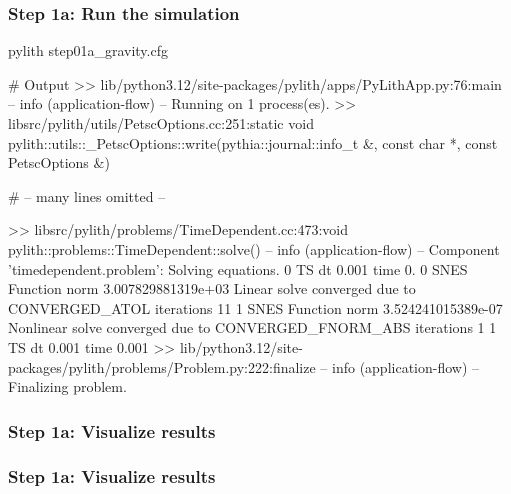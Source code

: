 \documentclass[aspectratio=169]{beamer}
\begin{document}
\begin{frame}[fragile]
  \frametitle{Step 1a: Run the simulation}
  \summary{}

\begin{pyrejournal}
pylith step01a_gravity.cfg

# Output
 >> lib/python3.12/site-packages/pylith/apps/PyLithApp.py:76:main
 -- info (application-flow)
 -- Running on 1 process(es).
 >> libsrc/pylith/utils/PetscOptions.cc:251:static void pylith::utils::_PetscOptions::write(pythia::journal::info_t &, const char *, const PetscOptions &)

 # -- many lines omitted --

 >> libsrc/pylith/problems/TimeDependent.cc:473:void pylith::problems::TimeDependent::solve()
 -- info (application-flow)
 -- Component 'timedependent.problem': Solving equations.
0 TS dt 0.001 time 0.
    0 SNES Function norm 3.007829881319e+03
      Linear solve converged due to CONVERGED_ATOL iterations 11
    1 SNES Function norm 3.524241015389e-07
    Nonlinear solve converged due to CONVERGED_FNORM_ABS iterations 1
1 TS dt 0.001 time 0.001
 >> lib/python3.12/site-packages/pylith/problems/Problem.py:222:finalize
 -- info (application-flow)
 -- Finalizing problem.
\end{pyrejournal}
  
\end{frame}



\begin{frame}
  \frametitle{Step 1a: Visualize results}

    
\end{frame}


\begin{frame}
  \frametitle{Step 1a: Visualize results}

    
\end{frame}
\end{document}
